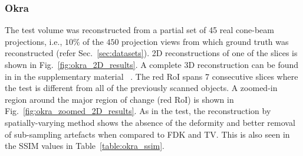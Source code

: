 \documentclass[journal]{IEEEtran}
\begin{document}
\subsubsection{\textbf{Okra}}
\label{Sec:okra_spatially_varying}
The test volume was reconstructed from a partial set of 45 real
cone-beam projections, i.e., $10\%$ of the $450$ projection views from which
ground truth was reconstructed (refer Sec.~\ref{sec:datasets}). 2D reconstructions of one of the
slices is shown in Fig.~\ref{fig:okra_2D_results}. A complete 3D
reconstruction can be found in in the supplementary material
~\cite{supp_paper}. The red RoI spans 7 consecutive slices where the
test is different from all of the previously scanned objects. A
zoomed-in region around the major region of change (red RoI) is shown
in Fig.~\ref{fig:okra_zoomed_2D_results}. As in the test, the
reconstruction by spatially-varying method shows the absence of the
deformity and better removal of sub-sampling artefacts when compared
to FDK and TV. This is also seen in the SSIM values in
Table~\ref{table:okra_ssim}.
\end{document}
